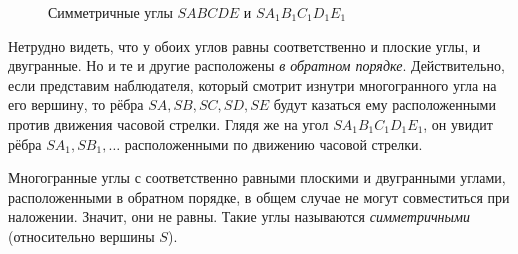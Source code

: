 \begin{figure}[htbp]
    \centering
    \renewcommand{\thefigure}{352}
    \captionsetup{name=Рис.,labelsep=period}
    
    \caption{Симметричные углы \(SABCDE\) и \(SA_1B_1C_1D_1E_1\)}\label{fig:kiselev-stereo-352}
\end{figure}

Нетрудно видеть, что у обоих углов равны соответственно и плоские углы, и двугранные. Но и те и другие расположены \emph{в обратном порядке}. Действительно, если представим наблюдателя, который смотрит изнутри многогранного угла на его вершину, то рёбра \(SA,SB,SC,SD,SE\) будут казаться ему расположенными против движения часовой стрелки. Глядя же на угол \(SA_1B_1C_1D_1E_1\), он увидит рёбра \(SA_1,SB_1,\ldots\) расположенными по движению часовой стрелки.

Многогранные углы с соответственно равными плоскими и двугранными углами, расположенными в обратном порядке, в общем случае не могут совместиться при наложении. Значит, они не равны. Такие углы называются \emph{симметричными} (относительно вершины \(S\)).

\clearpage
\endgroup
